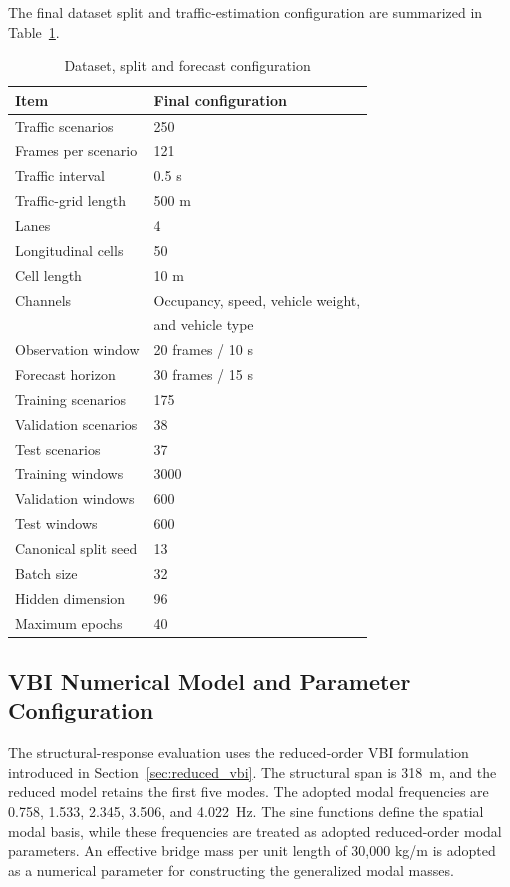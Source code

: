 \documentclass[journal]{IEEEtran}
\begin{document}
The final dataset split
and traffic-estimation configuration are summarized in Table~\ref{tab:dataset_configuration}.

\begin{table}[!htbp]
\centering
\caption{Dataset, split and forecast configuration}
\label{tab:dataset_configuration}
\footnotesize
\begin{tabular}{ll}
\toprule
\textbf{Item} & \textbf{Final configuration} \\
\midrule
Traffic scenarios       & 250 \\
Frames per scenario     & 121 \\
Traffic interval        & 0.5 s \\
Traffic-grid length     & 500 m \\
Lanes                   & 4 \\
Longitudinal cells      & 50 \\
Cell length             & 10 m \\
Channels                & Occupancy, speed, vehicle weight, \\
                        & and vehicle type \\
Observation window      & 20 frames / 10 s \\
Forecast horizon        & 30 frames / 15 s \\
Training scenarios      & 175 \\
Validation scenarios    & 38 \\
Test scenarios          & 37 \\
Training windows        & 3000 \\
Validation windows      & 600 \\
Test windows            & 600 \\
Canonical split seed    & 13 \\
Batch size              & 32 \\
Hidden dimension        & 96 \\
Maximum epochs          & 40 \\
\bottomrule
\end{tabular}
\end{table}




\subsection{VBI Numerical Model and Parameter Configuration}
\label{sec:vbi_configuration}

The structural-response
evaluation uses the reduced-order VBI formulation introduced in Section~\ref{sec:reduced_vbi}.
The structural span is 318~m, and the reduced model retains the first five modes. The adopted modal frequencies are 0.758, 1.533, 2.345, 3.506, and 4.022~Hz. The sine functions define the spatial modal basis, while these frequencies are treated as adopted reduced-order modal parameters. An effective bridge mass per unit length of 30,000 kg/m is
adopted as a numerical parameter for constructing the generalized modal masses.
\end{document}
